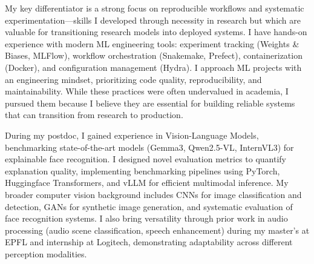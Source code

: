 \documentclass[11pt, a4paper]{awesome-cv}
\begin{document}
\begin{cvletter}

My key differentiator is a strong focus on reproducible workflows and systematic experimentation—skills I developed through necessity in research but which are valuable for transitioning research models into deployed systems. I have hands-on experience with modern ML engineering tools: experiment tracking (Weights \& Biases, MLFlow), workflow orchestration (Snakemake, Prefect), containerization (Docker), and configuration management (Hydra). I approach ML projects with an engineering mindset, prioritizing code quality, reproducibility, and maintainability. While these practices were often undervalued in academia, I pursued them because I believe they are essential for building reliable systems that can transition from research to production.


%
%


During my postdoc, I gained experience in Vision-Language Models, benchmarking state-of-the-art models (Gemma3, Qwen2.5-VL, InternVL3) for explainable face recognition. I designed novel evaluation metrics to quantify explanation quality, implementing benchmarking pipelines using PyTorch, Huggingface Transformers, and vLLM for efficient multimodal inference. My broader computer vision background includes CNNs for image classification and detection, GANs for synthetic image generation, and systematic evaluation of face recognition systems. I also bring versatility through prior work in audio processing (audio scene classification, speech enhancement) during my master's at EPFL and internship at Logitech, demonstrating adaptability across different perception modalities.


\end{cvletter}
\end{document}
